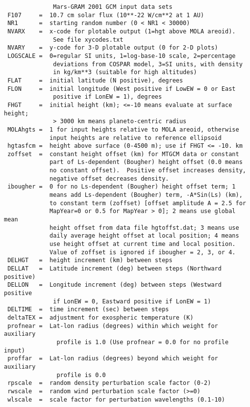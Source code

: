 \begin{lstlisting}
              Mars-GRAM 2001 GCM input data sets           
 F107     =  10.7 cm solar flux (10**-22 W/cm**2 at 1 AU)
 NR1      =  starting random number (0 < NR1 < 30000)
 NVARX    =  x-code for plotable output (1=hgt above MOLA areoid).
              See file xycodes.txt
 NVARY    =  y-code for 3-D plotable output (0 for 2-D plots)
 LOGSCALE =  0=regular SI units, 1=log-base-10 scale, 2=percentage
              deviations from COSPAR model, 3=SI units, with density
              in kg/km**3 (suitable for high altitudes)
 FLAT     =  initial latitude (N positive), degrees
 FLON     =  initial longitude (West positive if LowEW = 0 or East
              positive if LonEW = 1), degrees
 FHGT     =  initial height (km); <=-10 means evaluate at surface height;
              > 3000 km means planeto-centric radius
 MOLAhgts =  1 for input heights relative to MOLA areoid, otherwise
             input heights are relative to reference ellipsoid
 hgtasfcm =  height above surface (0-4500 m); use if FHGT <= -10. km
 zoffset  =  constant height offset (km) for MTGCM data or constant
             part of Ls-dependent (Bougher) height offset (0.0 means
             no constant offset).  Positive offset increases density,
             negative offset decreases density.
 ibougher =  0 for no Ls-dependent (Bougher) height offset term; 1
             means add Ls-dependent (Bougher) term, -A*Sin(Ls) (km),
             to constant term (zoffset) [offset amplitude A = 2.5 for 
             MapYear=0 or 0.5 for MapYear > 0]; 2 means use global mean
             height offset from data file hgtoffst.dat; 3 means use
             daily average height offset at local position; 4 means
             use height offset at current time and local position.
             Value of zoffset is ignored if ibougher = 2, 3, or 4.
 DELHGT   =  height increment (km) between steps
 DELLAT   =  Latitude increment (deg) between steps (Northward positive)
 DELLON   =  Longitude increment (deg) between steps (Westward positive
              if LonEW = 0, Eastward positive if LonEW = 1)
 DELTIME  =  time increment (sec) between steps
 deltaTEX =  adjustment for exospheric temperature (K)
 profnear =  Lat-lon radius (degrees) within which weight for auxiliary  
               profile is 1.0 (Use profnear = 0.0 for no profile input)
 proffar  =  Lat-lon radius (degrees) beyond which weight for auxiliary
               profile is 0.0
 rpscale  =  random density perturbation scale factor (0-2)
 rwscale  =  random wind perturbation scale factor (>=0)
 wlscale  =  scale factor for perturbation wavelengths (0.1-10)

\end{lstlisting}
